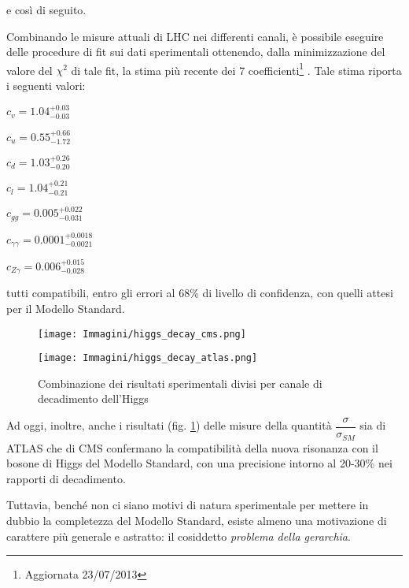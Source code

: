 e così di seguito.

Combinando le misure attuali di LHC nei differenti canali, è possibile eseguire delle procedure di fit
sui dati sperimentali ottenendo, dalla minimizzazione del valore del $\chi^{2}$ di tale fit, la stima più recente dei 7 coefficienti\footnote{Aggiornata 23/07/2013} 
\cite{falk}.
\newline
Tale stima riporta i seguenti valori:
\begin{center}
 $c_v=1.04^{+0.03}_{-0.03}$
\end{center}
\begin{center}
 $c_u=0.55^{+0.66}_{-1.72}$
\end{center}
\begin{center}
 $c_d=1.03^{+0.26}_{-0.20}$
\end{center}
\begin{center}
 $c_l=1.04^{+0.21}_{-0.21}$
\end{center}
\begin{center}
 $c_{gg}=0.005^{+0.022}_{-0.031}$
\end{center}
\begin{center}
 $c_{\gamma\gamma}=0.0001^{+0.0018}_{-0.0021}$
\end{center}
\begin{center}
 $c_{Z\gamma}=0.006^{+0.015}_{-0.028}$
\end{center}

tutti compatibili, entro gli errori al 68\% di livello di confidenza, con quelli attesi per il Modello Standard.

\begin{figure}[!htbp]
\begin{center}
\texttt{[image: Immagini/higgs\_decay\_cms.png]}
\end{center}
\begin{center}
\texttt{[image: Immagini/higgs\_decay\_atlas.png]}
\end{center}
\caption{Combinazione dei risultati sperimentali divisi per canale di decadimento dell'Higgs}
\label{higgs_decay_meas}
\end{figure}

Ad oggi, inoltre, anche i risultati (fig. \ref{higgs_decay_meas}) delle misure della quantità $\dfrac{\sigma}{\sigma_{SM}}$ sia di ATLAS che di CMS confermano la compatibilità della nuova risonanza con il bosone di Higgs 
del Modello Standard, con una precisione intorno al 20-30\% nei rapporti di decadimento.

\medskip
Tuttavia, benché non ci siano motivi di natura sperimentale per mettere in dubbio la completezza del Modello Standard,
esiste almeno una motivazione di carattere più generale e astratto: il cosiddetto \textit{problema della gerarchia}.


